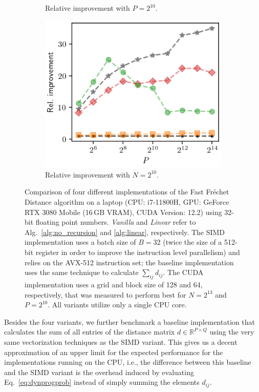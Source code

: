 \begin{figure}[htbp]
\begin{subfigure}{.49\textwidth}
        \caption{Relative improvement with $P = 2^{10}$.}
    \end{subfigure}
    \begin{subfigure}{.49\textwidth}
        \includegraphics[width=.8\textwidth]{img/laptop/rel_performance-pP.png}
        \caption{Relative improvement with $N = 2^{10}$.}
    \end{subfigure}
    \caption{Comparison of four different implementations of the Fast Fr\'echet Distance algorithm on a laptop (CPU: i7-11800H, GPU: GeForce RTX 3080 Mobile (16\,GB VRAM), CUDA Version: 12.2) using 32-bit floating point numbers. \textit{Vanilla} and \textit{Linear} refer to Alg.~\ref{alg:no_recursion} and \ref{alg:linear}, respectively. The SIMD implementation uses a batch size of $B = 32$ (twice the size of a 512-bit register in order to improve the instruction level parallelism) and relies on the AVX-512 instruction set; the baseline implementation uses the same technique to calculate $\sum_{ij} d_{ij}$. The CUDA implementation uses a grid and block size of 128 and 64, respectively, that was measured to perform best for $N=2^{13}$ and $P=2^{10}$. All variants utilize only a single CPU core.}
    \label{fig:benchmark_laptop}
\end{figure}

Besides the four variants, we further benchmark a baseline implementation that calculates the sum of all entries of the distance matrix $d \in \mathbb{R}^{P \times Q}$ using the very same vectorization techniques as the SIMD variant.
This gives us a decent approximation of an upper limit for the expected performance for the implementations running on the CPU, i.e., the difference between this baseline and the SIMD variant is the overhead induced by evaluating Eq.~\eqref{eq:dynprogprob} instead of simply summing the elements $d_{ij}$.

